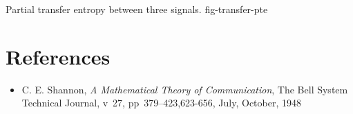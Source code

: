 {Partial transfer entropy between three signals.}
{fig-transfer-pte}

\section{References}
\label{sect-entropy-refs}

\begin{itemize}
%
\item C. E. Shannon, \textit{A Mathematical Theory of Communication},
The Bell System Technical Journal, v~27, pp~379--423,623-656, July, October,
1948
%
\end{itemize}

%

